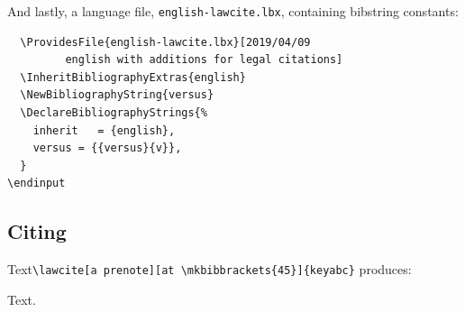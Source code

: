 And lastly, a language file, \verb|english-lawcite.lbx|,  containing bibstring constants:

\begin{verbatim}
  \ProvidesFile{english-lawcite.lbx}[2019/04/09 
         english with additions for legal citations]
  \InheritBibliographyExtras{english}
  \NewBibliographyString{versus}
  \DeclareBibliographyStrings{%
    inherit   = {english},
    versus = {{versus}{v}},
  }
\endinput
\end{verbatim}

\subsection{Citing}
Text\verb|\lawcite[a prenote][at \mkbibbrackets{45}]{keyabc}| produces:
 
Text.



